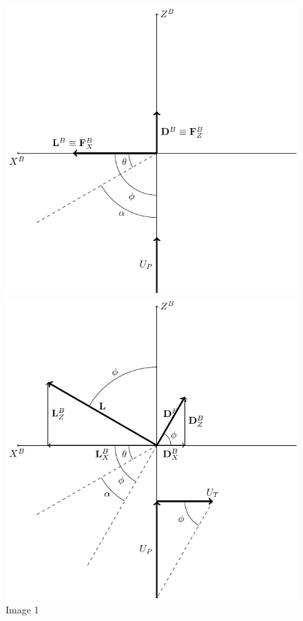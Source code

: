 \begin{figure}[!htb]
    \centering
    \begin{minipage}{0.45\textwidth}
        \centering
        \includegraphics[width=\linewidth]{Figures/implementation/bet/blade_forces/blade_element_forces_1.pdf} %
        \caption{Image 1}
    \end{minipage}
    \hfill
    \begin{minipage}{0.45\textwidth}
        \centering
        \includegraphics[width=\linewidth]{Figures/implementation/bet/blade_forces/blade_element_forces_2.pdf} %

\end{minipage}
\end{figure}
